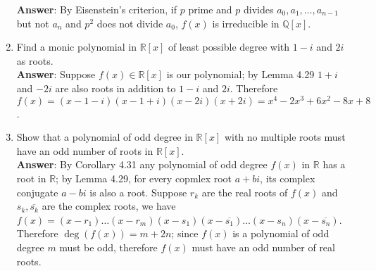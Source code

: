 \documentclass{article}
\begin{document}
\begin{enumerate}
            \textbf{Answer}: By Eisenstein's criterion, if $p$ prime and $p$ divides $a_0,a_1,\ldots,a_{n-1}$ but not $a_n$ and $p^2$ does not divide $a_0$, $f(x)$ is irreducible in $\mathbb{Q}[x]$.
      \item Find a monic polynomial in $\mathbb{R}[x]$ of least possible degree with $1-i$ and $2i$ as roots.\\
            \textbf{Answer}: Suppose $f(x)\in\mathbb{R}[x]$ is our polynomial; by Lemma 4.29 $1+i$ and $-2i$ are also roots in addition to $1-i$ and $2i$. Therefore $f(x)=(x-1-i)(x-1+i)(x-2i)(x+2i)=x^4-2x^3+6x^2-8x+8$.
      \item Show that a polynomial of odd degree in $\mathbb{R}[x]$ with no multiple roots must have an odd number of roots in $\mathbb{R}[x]$.\\
            \textbf{Answer}: By Corollary 4.31 any polynomial of odd degree $f(x)$ in $\mathbb{R}$ has a root in $\mathbb{R}$; by Lemma 4.29, for every copmlex root $a+bi$, its complex conjugate $a-bi$ is also a root. Suppose $r_k$ are the real roots of $f(x)$ and $s_k,\overline{s_k}$ are the complex roots, we have $f(x)=(x-r_1)\ldots(x-r_m)(x-s_1)(x-\overline{s_1})\ldots(x-s_n)(x-\overline{s_n})$. Therefore $\deg(f(x))=m+2n$; since $f(x)$ is a polynomial of odd degree $m$ must be odd, therefore $f(x)$ must have an odd number of real roots.
\end{enumerate}
\end{document}
